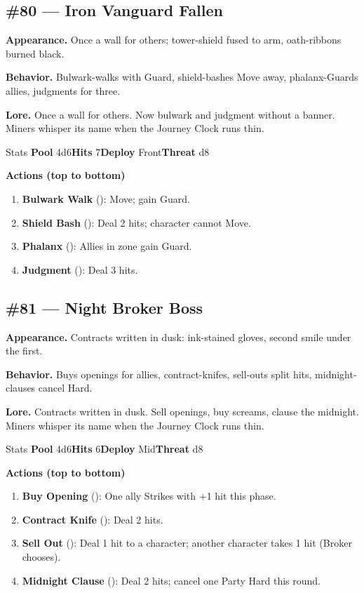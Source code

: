 \subsection*{\#80 --- Iron Vanguard Fallen}

\textbf{Appearance.} Once a wall for others; tower-shield fused to arm, oath-ribbons burned black.

\textbf{Behavior.} Bulwark-walks with Guard, shield-bashes Move away, phalanx-Guards allies, judgments for three.

\textbf{Lore.} Once a wall for others. Now bulwark and judgment without a banner. Miners whisper its name when the Journey Clock runs thin.

\begin{monsterentry}{Stats}
\textbf{Pool} 4d6\quad\textbf{Hits} 7\quad\textbf{Deploy} Front\quad\textbf{Threat} d8

\textbf{Actions (top to bottom)}
\begin{enumerate}\setlength{\itemsep}{0.15em}\setlength{\parskip}{0pt}
  \item \textbf{Bulwark Walk} (\easy): Move; gain Guard.
  \item \textbf{Shield Bash} (\medium): Deal 2 hits; character cannot Move.
  \item \textbf{Phalanx} (\medium): Allies in zone gain Guard.
  \item \textbf{Judgment} (\hard): Deal 3 hits.
\end{enumerate}
\end{monsterentry}

\subsection*{\#81 --- Night Broker Boss}

\textbf{Appearance.} Contracts written in dusk: ink-stained gloves, second smile under the first.

\textbf{Behavior.} Buys openings for allies, contract-knifes, sell-outs split hits, midnight-clauses cancel Hard.

\textbf{Lore.} Contracts written in dusk. Sell openings, buy screams, clause the midnight. Miners whisper its name when the Journey Clock runs thin.

\begin{monsterentry}{Stats}
\textbf{Pool} 4d6\quad\textbf{Hits} 6\quad\textbf{Deploy} Mid\quad\textbf{Threat} d8

\textbf{Actions (top to bottom)}
\begin{enumerate}\setlength{\itemsep}{0.15em}\setlength{\parskip}{0pt}
  \item \textbf{Buy Opening} (\easy): One ally Strikes with +1 hit this phase.
  \item \textbf{Contract Knife} (\medium): Deal 2 hits.
  \item \textbf{Sell Out} (\hard): Deal 1 hit to a character; another character takes 1 hit (Broker chooses).
  \item \textbf{Midnight Clause} (\hard): Deal 2 hits; cancel one Party Hard this round.
\end{enumerate}
\end{monsterentry}

